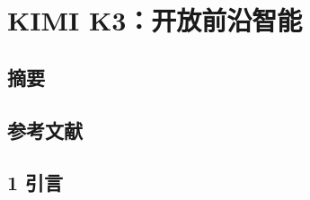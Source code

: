 
\section{KIMI K3：开放前沿智能}\label{kimi-k3}

\subsection{摘要}\label{abstract}
\subsection{参考文献}\label{references}

\subsection{1 引言}\label{introduction}

